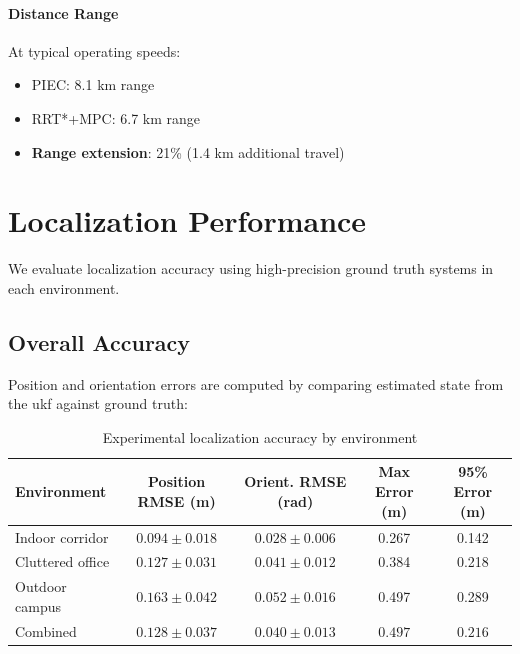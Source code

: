 \paragraph{Distance Range}
At typical operating speeds:
\begin{itemize}
    \item PIEC: 8.1 km range
    \item RRT*+MPC: 6.7 km range
    \item \textbf{Range extension}: 21\% (1.4 km additional travel)
\end{itemize}


\section{Localization Performance}
\label{sec:localization_performance}

We evaluate localization accuracy using high-precision ground truth systems in each environment.

\subsection{Overall Accuracy}

Position and orientation errors are computed by comparing estimated state from the \acrshort{ukf} against ground truth:

\begin{table}[htbp]
\centering
\caption{Experimental localization accuracy by environment}
\label{tab:exp_localization_accuracy}
\begin{tabular}{lcccc}
\toprule
\textbf{Environment} & \textbf{Position RMSE (m)} & \textbf{Orient. RMSE (rad)} & \textbf{Max Error (m)} & \textbf{95\% Error (m)} \\
\midrule
Indoor corridor & $\mathbf{0.094 \pm 0.018}$ & $0.028 \pm 0.006$ & 0.267 & 0.142 \\
Cluttered office & $0.127 \pm 0.031$ & $0.041 \pm 0.012$ & 0.384 & 0.218 \\
Outdoor campus & $0.163 \pm 0.042$ & $0.052 \pm 0.016$ & 0.497 & 0.289 \\
\midrule
Combined & $\mathbf{0.128 \pm 0.037}$ & $\mathbf{0.040 \pm 0.013}$ & $\mathbf{0.497}$ & $\mathbf{0.216}$ \\
\bottomrule
\end{tabular}
\end{table}

